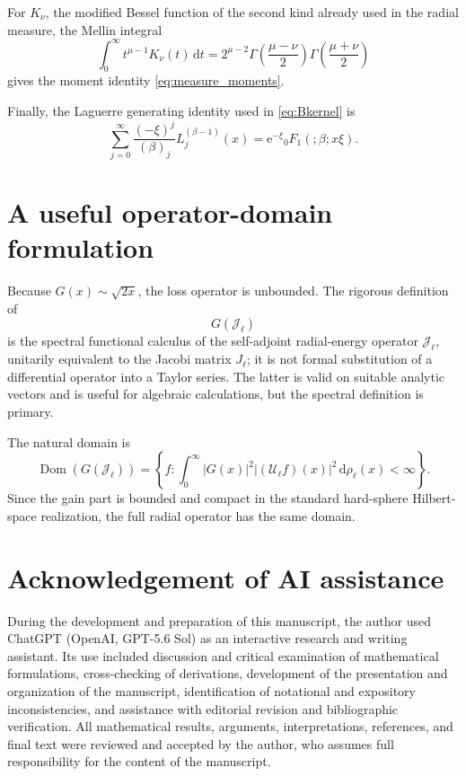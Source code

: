 \documentclass[11pt]{article}
\numberwithin{equation}{section}
\newcommand{\dd}{\,\mathrm d}
\newcommand{\Dom}{\operatorname{Dom}}
\newcommand{\e}{\mathrm e}
\theoremstyle{definition}
\begin{document}
For $K_\nu$, the modified Bessel function of the second kind already used
in the radial measure, the Mellin integral
\begin{equation}
 \int_0^\infty
 t^{\mu-1}K_\nu(t)\dd t
 =
 2^{\mu-2}
 \Gamma\!\left(\frac{\mu-\nu}{2}\right)
 \Gamma\!\left(\frac{\mu+\nu}{2}\right)
\end{equation}
gives the moment identity \eqref{eq:measure_moments}.

Finally, the Laguerre generating identity used in
\eqref{eq:Bkernel} is
\begin{equation}
 \sum_{j=0}^\infty
 \frac{(-\xi)^j}{(\beta)_j}
 L_j^{(\beta-1)}(x)
 =
 \e^{-\xi}{}_0F_1(; \beta;x\xi).
\end{equation}

\section{A useful operator-domain formulation}
\label{app:operator_domain}

Because $G(x)\sim\sqrt{2x}$, the loss operator is unbounded.  The rigorous
definition of
\begin{equation}
 G(\mathcal J_\ell)
\end{equation}
is the spectral functional calculus of the self-adjoint radial-energy operator
$\mathcal J_\ell$, unitarily equivalent to the Jacobi matrix $J_\ell$; it is
not formal substitution of a differential operator into a Taylor series.  The latter is valid on suitable analytic vectors and is useful
for algebraic calculations, but the spectral definition is primary.

The natural domain is
\begin{equation}
 \Dom(G(\mathcal J_\ell))
 =
 \left\{
 f:
 \int_0^\infty
 |G(x)|^2
 |(\mathcal U_\ell f)(x)|^2
 \dd\rho_\ell(x)
 <\infty
 \right\}.
\end{equation}
Since the gain part is bounded and compact in the standard hard-sphere
Hilbert-space realization, the full radial operator has the same domain.


\section*{Acknowledgement of AI assistance}
During the development and preparation of this manuscript, the author used
ChatGPT (OpenAI, GPT-5.6 Sol) as an interactive research and writing assistant.
Its use included discussion and critical examination of mathematical
formulations, cross-checking of derivations, development of the presentation
and organization of the manuscript, identification of notational and
expository inconsistencies, and assistance with editorial revision and
bibliographic verification.  All mathematical results, arguments,
interpretations, references, and final text were reviewed and accepted by the
author, who assumes full responsibility for the content of the manuscript.
\end{document}
